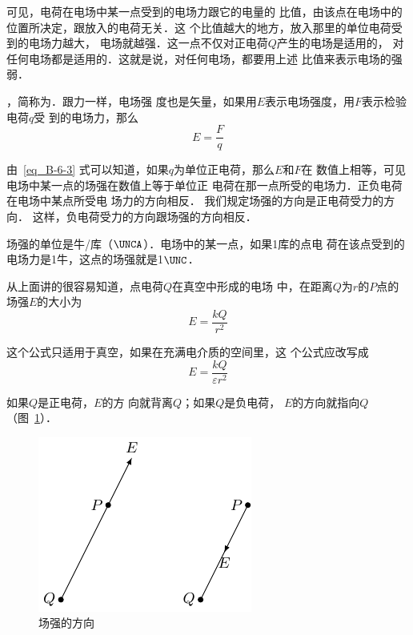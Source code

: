 可见，电荷在电场中某一点受到的电场力跟它的电量的
比值，由该点在电场中的位置所决定，跟放入的电荷无关．这
个比值越大的地方，放入那里的单位电荷受到的电场力越大，
电场就越强．这一点不仅对正电荷$Q$产生的电场是适用的，
对任何电场都是适用的．这就是说，对任何电场，都要用上述
比值来表示电场的强弱．

，简称为．跟力一样，电场强
度也是矢量，如果用$E$表示电场强度，用$F$表示检验电荷$q$受
到的电场力，那么
\begin{equation}\label{eq_B-6-3}
    E=\frac{F}{q}
\end{equation}

由~\eqref{eq_B-6-3} 式可以知道，如果$q$为单位正电荷，那么$E$和$F$在
数值上相等，可见电场中某一点的场强在数值上等于单位正
电荷在那一点所受的电场力．正负电荷在电场中某点所受电
场力的方向相反．
我们规定场强的方向是正电荷受力的方向．
这样，负电荷受力的方向跟场强的方向相反．

场强的单位是牛/库（$\UNCA$）．电场中的某一点，如果1库的点电
荷在该点受到的电场力是1牛，这点的场强就是1$\UNC$．

从上面讲的很容易知道，点电荷$Q$在真空中形成的电场
中，在距离$Q$为$r$的$P$点的场强$E$的大小为
\begin{equation}\label{eq_B-6-4}
    E=\frac{kQ}{r^2}
\end{equation}

这个公式只适用于真空，如果在充满电介质的空间里，这
个公式应改写成
\begin{equation}\label{eq_B-6-5}
    E=\frac{kQ}{\varepsilon r^2}
\end{equation}

如果$Q$是正电荷，$E$的方
向就背离$Q$；如果$Q$是负电荷，
$E$的方向就指向$Q$（图~\ref{fig_B_6-5}）．
\begin{figure}[htbp]
    \centering
    \includegraphics{fig/B/6-5.pdf}
    \caption{场强的方向}\label{fig_B_6-5}
\end{figure}

